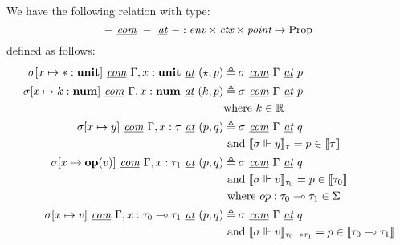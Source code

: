 \begin{definition}
  We have the following relation with type:
  $$- \textit{ \underline{com} } - \textit{ \underline{at} } - : \textit{env}
  \times \textit{ctx} \times \textit{point} \to \text{Prop}$$ 
  defined as follows:
  \begin{equation}
    \begin{normalsize}
    \begin{aligned}[c] 
      \sigma[x \mapsto * : \textbf{unit}] \textit{ \underline{com} } \Gamma, x:
      \textbf{unit} \textit{ \underline{at} } (\star, p) &\triangleq \sigma
      \textit{ \underline{com} } \Gamma \textit{ \underline{at} } p \\
      \sigma[x \mapsto k : \textbf{num}] \textit{ \underline{com} } \Gamma, x:
      \textbf{num} \textit{ \underline{at} } (k, p) &\triangleq \sigma \textit{
        \underline{com} } \Gamma \textit{ \underline{at} } p \\
      &\text{where } k \in \mathbb{R} \\
      \sigma[x \mapsto y] \textit{ \underline{com} } \Gamma, x : \tau \textit{
        \underline{at} } (p, q) & \triangleq \sigma \textit{ \underline{com} }
      \Gamma \textit{ \underline{at} } q \\
      & \text{ and } \llbracket \sigma \Vdash y \rrbracket_{\tau} = p\in
      \llbracket \tau \rrbracket \\
      \sigma[x \mapsto \mathbf{op}(v)] \textit{ \underline{com} } \Gamma, x:
      \tau_1 \textit{ \underline{at} } (p, q) &\triangleq \sigma \textit{
        \underline{com} } \Gamma \textit{ \underline{at} } q \\ 
      & \text{ and } \llbracket \sigma \Vdash v \rrbracket_{\tau_0} = p \in
      \llbracket \tau_0 \rrbracket \\
      & \text{ where } op : \tau_0 \multimap \tau_1 \in \Sigma \\
      \sigma[x \mapsto v] \textit{ \underline{com} } \Gamma, x : \tau_0
      \multimap \tau_1 \textit{ \underline{at} } (p, q) &\triangleq \sigma
      \textit{ \underline{com} } \Gamma \textit{ \underline{at} } q \\ 
      & \text{ and } \llbracket \sigma \Vdash v \rrbracket_{\tau_0 \multimap
      \tau_1} = p \in \llbracket \tau_0 \multimap \tau_1 \rrbracket

\end{aligned}
\end{normalsize}
\end{equation}
\end{definition}
